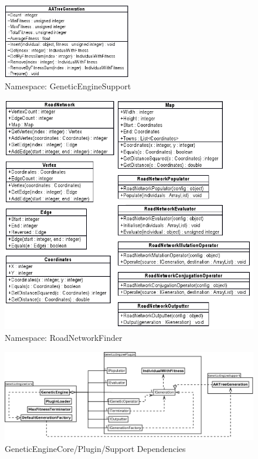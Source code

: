 \begin{figure}[ht!]
 \caption{Namespace: GeneticEngineSupport}\label{fig:GeneticEngineSupport}
 \centering
 \includegraphics[width=0.5\textwidth]{../GeneticEngineSupportDetail.png}
\end{figure}

\begin{figure}[ht!]
 \caption{Namespace: RoadNetworkFinder}\label{fig:RoadNetworkFinder}
 \centering
 \includegraphics[width=\textwidth]{../RoadNetworkFinderDetail.png}
\end{figure}

\begin{figure}[ht!]
 \caption{GeneticEngineCore/Plugin/Support Dependencies}\label{fig:GeneticEngineDependencies}
 \centering
 \includegraphics[width=\textwidth]{../GeneticEngineCorePluginSupport.png}
\end{figure}

